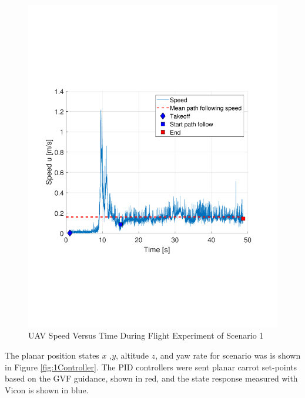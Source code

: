 \documentclass[numbered,pdftex]{ohio-etd}
\begin{document}
\begin{figure}[H]
	\centering
	\includegraphics[trim = 0 150 0 200, clip, width=12cm]{Figures/results/compareFigures/1u}
	\caption{UAV Speed Versus Time During Flight Experiment of Scenario 1}
	\label{fig:1u}
\end{figure}


The planar position states $x$ ,$y$, altitude $z$, and yaw rate for scenario was is shown in Figure \ref{fig:1Controller}. The PID controllers were sent planar carrot set-points based on the GVF guidance, shown in red, and the state response measured with Vicon is shown in blue. 
\end{document}
